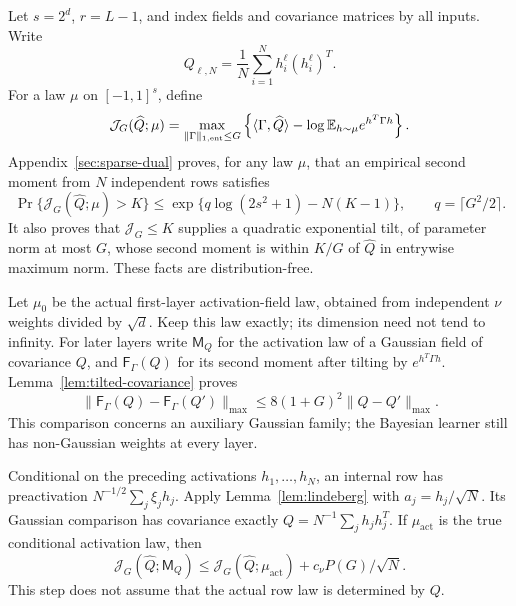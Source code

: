 Let $s=2^d$, $r=L-1$, and index fields and covariance matrices by all
inputs. Write
\[
 Q_{\ell,N}=\frac1N\sum_{i=1}^N h_i^\ell(h_i^\ell)^T.
\]
For a law $\mu$ on $[-1,1]^s$, define
\begin{equation}\label{eq:certificate}
 \mathcal J_G(\widehat Q;\mu)=
 \max_{\|\Gamma\|_{1,\mathrm{ent}}\leq G}
 \left\{\langle\Gamma,\widehat Q\rangle
       -\log\mathbb E_{h\sim\mu}e^{h^T\Gamma h}\right\}.
\end{equation}
Appendix~\ref{sec:sparse-dual} proves, for any law $\mu$, that an
empirical second moment from $N$ independent rows satisfies
\begin{equation}\label{eq:certificate-tail}
 \Pr\{\mathcal J_G(\widehat Q;\mu)>K\}
 \leq\exp\{q\log(2s^2+1)-N(K-1)\},\qquad q=\lceil G^2/2\rceil.
\end{equation}
It also proves that $\mathcal J_G\leq K$ supplies a quadratic
exponential tilt, of parameter norm at most $G$, whose second moment is
within $K/G$ of $\widehat Q$ in entrywise maximum norm. These facts
are distribution-free.

Let $\mu_0$ be the actual first-layer activation-field law, obtained
from independent $\nu$ weights divided by $\sqrt d$. Keep this law
exactly; its dimension need not tend to infinity. For later layers write
$\mathsf M_Q$ for the activation law of a Gaussian field of covariance
$Q$, and $\mathsf F_\Gamma(Q)$ for its second moment after tilting by
$e^{h^T\Gamma h}$. Lemma~\ref{lem:tilted-covariance} proves
\begin{equation}\label{eq:covariance-stability}
 \|\mathsf F_\Gamma(Q)-\mathsf F_\Gamma(Q')\|_{\max}
 \leq8(1+G)^2\|Q-Q'\|_{\max}.
\end{equation}
This comparison concerns an auxiliary Gaussian family; the Bayesian
learner still has non-Gaussian weights at every layer.

Conditional on the preceding activations $h_1,\ldots,h_N$, an internal
row has preactivation $N^{-1/2}\sum_j\xi_jh_j$. Apply
Lemma~\ref{lem:lindeberg} with $a_j=h_j/\sqrt N$. Its Gaussian
comparison has covariance exactly $Q=N^{-1}\sum_jh_jh_j^T$.
If $\mu_{\mathrm{act}}$ is the true conditional activation law, then
\begin{equation}\label{eq:certificate-transfer}
 \mathcal J_G(\widehat Q;\mathsf M_Q)
 \leq\mathcal J_G(\widehat Q;\mu_{\mathrm{act}})
       +c_\nu P(G)/\sqrt N.
\end{equation}
This step does not assume that the actual row law is determined by $Q$.

